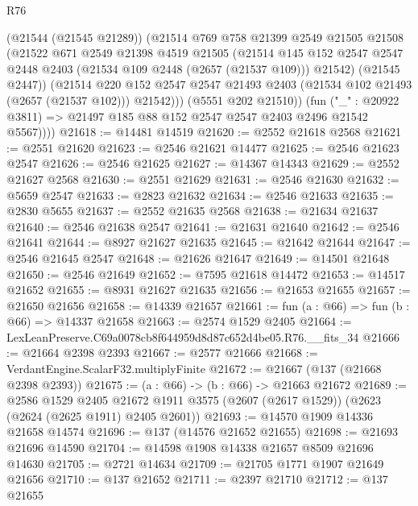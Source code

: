 \begin{lexlean}{R76}
\begin{coremodule}
              (@21544 (@21545 @21289))
              (@21514
                @769
                @758
                @21399
                @2549
                @21505
                @21508
                (@21522
                  @671
                  @2549
                  @21398
                  @4519
                  @21505
                  (@21514
                    @145
                    @152
                    @2547
                    @2547
                    @2448
                    @2403
                    (@21534 @109 @2448 (@2657 (@21537 @109)))
                    @21542)
                  (@21545 @2447))
                (@21514
                  @220
                  @152
                  @2547
                  @2547
                  @21493
                  @2403
                  (@21534 @102 @21493 (@2657 (@21537 @102)))
                  @21542)))
            (@5551 @202 @21510))
          (fun ("_" : @20922 @3811) => @21497 @185 @88 @152 @2547 @2547 @2403 @2496 @21542 @5567))))
@21618 := @14481 @14519
@21620 := @2552 @21618 @2568
@21621 := @2551 @21620
@21623 := @2546 @21621 @14477
@21625 := @2546 @21623 @2547
@21626 := @2546 @21625
@21627 := @14367 @14343
@21629 := @2552 @21627 @2568
@21630 := @2551 @21629
@21631 := @2546 @21630
@21632 := @5659 @2547
@21633 := @2823 @21632
@21634 := @2546 @21633
@21635 := @2830 @5655
@21637 := @2552 @21635 @2568
@21638 := @21634 @21637
@21640 := @2546 @21638 @2547
@21641 := @21631 @21640
@21642 := @2546 @21641
@21644 := @8927 @21627 @21635
@21645 := @21642 @21644
@21647 := @2546 @21645 @2547
@21648 := @21626 @21647
@21649 := @14501 @21648
@21650 := @2546 @21649
@21652 := @7595 @21618 @14472
@21653 := @14517 @21652
@21655 := @8931 @21627 @21635
@21656 := @21653 @21655
@21657 := @21650 @21656
@21658 := @14339 @21657
@21661 := fun (a : @66) => fun (b : @66) => @14337 @21658
@21663 := @2574 @1529 @2405
@21664 := LexLeanPreserve.C69a0078cb8f644959d8d87c652d4be05.R76.__fits_34
@21666 := @21664 @2398 @2393
@21667 := @2577 @21666
@21668 := VerdantEngine.ScalarF32.multiplyFinite
@21672 := @21667 (@137 (@21668 @2398 @2393))
@21675 := (a : @66) -> (b : @66) -> @21663 @21672
@21689 := @2586
    @1529
    @2405
    @21672
    @1911
    @3575
    (@2607 (@2617 @1529))
    (@2623 (@2624 (@2625 @1911) @2405 @2601))
@21693 := @14570 @1909 @14336 @21658 @14574
@21696 := @137 (@14576 @21652 @21655)
@21698 := @21693 @21696 @14590
@21704 := @14598 @1908 @14338 @21657 @8509 @21696 @14630
@21705 := @2721 @14634
@21709 := @21705 @1771 @1907 @21649 @21656
@21710 := @137 @21652
@21711 := @2397 @21710
@21712 := @137 @21655

\end{coremodule}
\end{lexlean}
